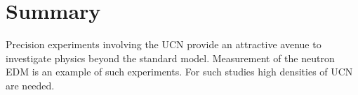 
    




  
  


  




\section{Summary}
Precision experiments involving the UCN provide an attractive avenue
to investigate physics beyond the standard model. Measurement of the
neutron EDM is an example of such experiments. For such studies high
densities of UCN are needed.

